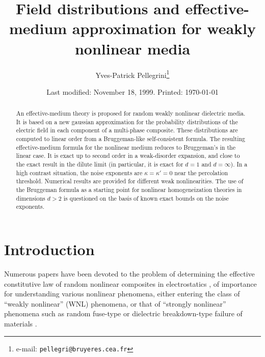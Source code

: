 
\draft
\makeatletter
\title{Field distributions and effective-medium approximation  for weakly nonlinear media}
\author{Yves-Patrick Pellegrini\thanks{e-mail: {\protect\tt   pellegri@bruyeres.cea.fr}}}
\address{ Service de Physique de la Mati\`{e}re Condens\'{e}e, \\  Commissariat \`{a} l'Energie Atomique,\\  BP12, 91680 Bruy\`{e}res-le-Ch\^{a}tel, France.}
\date{Last modified: November 18, 1999. Printed: \today}
\maketitle
\makeatother
\begin{abstract}
An effective-medium theory is proposed for random weakly nonlinear dielectric
media. It is based on a new gaussian approximation for the probability
distributions of the electric field in each component of a multi-phase
composite. These distributions are computed to linear order from a
Bruggeman-like self-consistent formula. The resulting effective-medium formula
for the nonlinear medium reduces to Bruggeman's in the linear case. It is exact
up to second order in a weak-disorder expansion, and close to the exact result
in the dilute limit (in particular, it is exact for $d=1$ and $d=\infty$). In a
high contrast situation, the noise exponents are $\kappa=\kappa'=0$ near the
percolation threshold. Numerical results are provided for different
weak nonlinearities. The use of the Bruggeman formula as a starting point
for nonlinear homogeneization theories in dimensions $d>2$ is questioned on
the basis of known exact bounds on the noise exponents.
\end{abstract}
\bigskip

\makeatother
\section{Introduction}
\label{intro}
Numerous papers have been devoted to the problem of determining the effective
constitutive law of random nonlinear composites in electrostatics
\cite{AHAR87,STRO88,ZENG88,BERG89,BLUM89,KOTH90,PONT92,GU92,YU93,YU94,LEE95,GAO96,WAN96,SALI97,PONT97,BART98},
of importance for understanding
various nonlinear phenomena, either entering the class
of ``weakly nonlinear'' (WNL) phenomena, or that of ``strongly nonlinear''
phenomena such as random fuse-type or dielectric breakdown-type failure of
materials \cite{DUXB86}.

